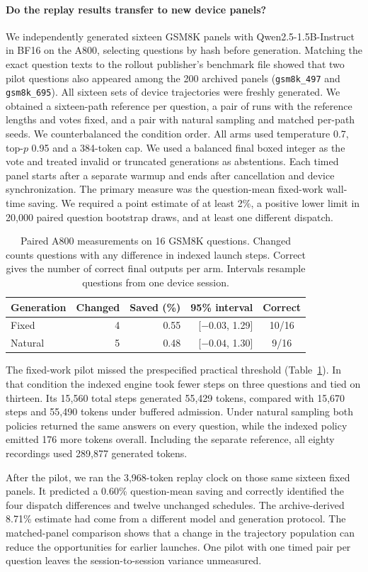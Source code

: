 \paragraph{Do the replay results transfer to new device panels?}
We independently generated sixteen GSM8K panels with Qwen2.5-1.5B-Instruct in BF16 on the A800, selecting questions by hash before generation. Matching the exact question texts to the rollout publisher's benchmark file showed that two pilot questions also appeared among the 200 archived panels (\texttt{gsm8k\_497} and \texttt{gsm8k\_695}). All sixteen sets of device trajectories were freshly generated. We obtained a sixteen-path reference per question, a pair of runs with the reference lengths and votes fixed, and a pair with natural sampling and matched per-path seeds. We counterbalanced the condition order. All arms used temperature 0.7, top-$p$ 0.95 and a 384-token cap. We used a balanced final boxed integer as the vote and treated invalid or truncated generations as abstentions. Each timed panel starts after a separate warmup and ends after cancellation and device synchronization. The primary measure was the question-mean fixed-work wall-time saving. We required a point estimate of at least 2\%, a positive lower limit in 20,000 paired question bootstrap draws, and at least one different dispatch.

\begin{table}[tb]\centering
\caption{Paired A800 measurements on 16 GSM8K questions. Changed counts questions with any difference in indexed launch steps. Correct gives the number of correct final outputs per arm. Intervals resample questions from one device session.}\label{tab:a800pilot}
\small\setlength{\tabcolsep}{3pt}
\begin{tabular}{lrrrc}\toprule
Generation & Changed & Saved (\%) & 95\% interval & Correct\\\midrule
Fixed & 4 & 0.55 & [$-0.03$, 1.29] & 10/16\\
Natural & 5 & 0.48 & [$-0.04$, 1.30] & 9/16\\\bottomrule
\end{tabular}
\end{table}
The fixed-work pilot missed the prespecified practical threshold (Table~\ref{tab:a800pilot}). In that condition the indexed engine took fewer steps on three questions and tied on thirteen. Its 15,560 total steps generated 55,429 tokens, compared with 15,670 steps and 55,490 tokens under buffered admission. Under natural sampling both policies returned the same answers on every question, while the indexed policy emitted 176 more tokens overall. Including the separate reference, all eighty recordings used 289,877 generated tokens.

After the pilot, we ran the 3,968-token replay clock on those same sixteen fixed panels. It predicted a 0.60\% question-mean saving and correctly identified the four dispatch differences and twelve unchanged schedules. The archive-derived 8.71\% estimate had come from a different model and generation protocol. The matched-panel comparison shows that a change in the trajectory population can reduce the opportunities for earlier launches. One pilot with one timed pair per question leaves the session-to-session variance unmeasured.
